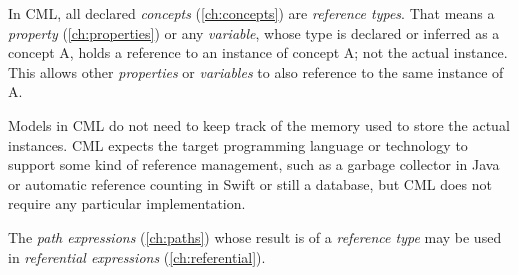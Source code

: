 In CML, all declared \emph{concepts} (\ref{ch:concepts}) are \emph{reference types}.
That means a \emph{property} (\ref{ch:properties}) or any \emph{variable},
whose type is declared or inferred as a concept A, holds a reference
to an instance of concept A; not the actual instance.
This allows other \emph{properties} or \emph{variables}
to also reference to the same instance of A.

Models in CML do not need to keep track of the memory used
to store the actual instances.
CML expects the target programming language or technology
to support some kind of reference management,
such as a garbage collector in Java or automatic reference counting in Swift
or still a database,
but CML does not require any particular implementation.

The \emph{path expressions} (\ref{ch:paths})
whose result is of a \emph{reference type} may be used
in \emph{referential expressions} (\ref{ch:referential}).
